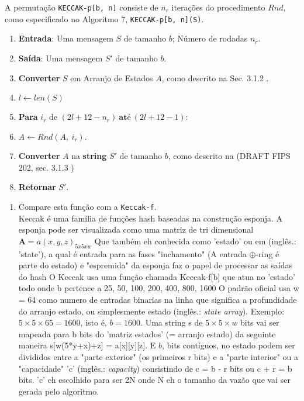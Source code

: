 \documentclass[12pt, a4paper]{article}
\begin{document}
\begin{enumerate}
\begin{enumerate}
A permutação \verb|KECCAK-p[b, n]| consiste de $n_r$ iterações do procedimento
$Rnd$, como especificado no Algoritmo 7, \verb|KECCAK-p[b, n](S)|.\\

  \begin{enumerate}
    \item \textbf{Entrada}: Uma mensagem $S$ de tamanho $b$; Número de rodadas
    $n_r$.
    \item \textbf{Saída}: Uma mensagem $S'$ de tamanho $b$.
    \item \textbf{Converter} $S$ em Arranjo de Estados $A$, como descrito na
    Sec. 3.1.2
    \cite{nist}.
    \item $l \leftarrow len(S)$
    \item \textbf{Para} $i_r$ de $(2l + 12 - n_r)\ \textbf{até}\ (2l + 12 - 1):$
    \item[] \quad $A \leftarrow Rnd(A,\ i_r)$.
    \item \textbf{Converter} $A$ na \textbf{string} $S'$ de tamanho $b$, como
    descrito na (DRAFT FIPS 202, sec. 3.1.3 \cite{nist})
    \item \textbf{Retornar} $S'$.\\
  \end{enumerate}

\begin{enumerate}

  \item Compare esta função com a \verb|Keccak-f|.\\

      Keccak é uma família de funções hash baseadas na construção esponja. A
      esponja pode ser visualizada como uma matriz de tri dimensional
      $\textbf{A} = a(x,y,z)_{5x5xw}$ Que também eh conhecida como 'estado' ou
      em (inglês.: 'state'), a qual é entrada para as fases "inchamento" (A
      entrada $\oplus$-ring é parte do estado) e "espremida" da esponja faz o
      papel de processar as saídas do hash O Keccak usa uma função chamada
      Keccak-f[b] que atua no 'estado' todo onde b pertence a {25, 50, 100, 200,
      400, 800, 1600} O padrão oficial usa w = 64 como numero de entradas
      binarias na linha que significa a profundidade do arranjo estado, ou
      simplesmente estado (inglês.: \textit{state array}). Exemplo: $5\times
      5\times 65 = 1600$, isto é, $b = 1600$. Uma string s de $5\times 5\times
      w$ bits vai ser mapeada para b bits do 'matriz estados' (= arranjo estado)
      da seguinte maneira s[w(5*y+x)+z] = a[x][y][z]. E $b$, bits contíguos, no
      estado podem ser divididos entre a "parte exterior" (os primeiros r bits)
      e a "parte interior" ou a "capacidade" 'c' (inglês.: \textit{capacity})
      consistindo de c = b - r bits ou c + r = b bits. 'c' eh escolhido para ser
      2N onde N eh o tamanho da vazão que vai ser gerada pelo algoritmo.
      \cite{rosie14, keccak}\\


\end{enumerate}
\end{enumerate}
\end{enumerate}
\end{document}
